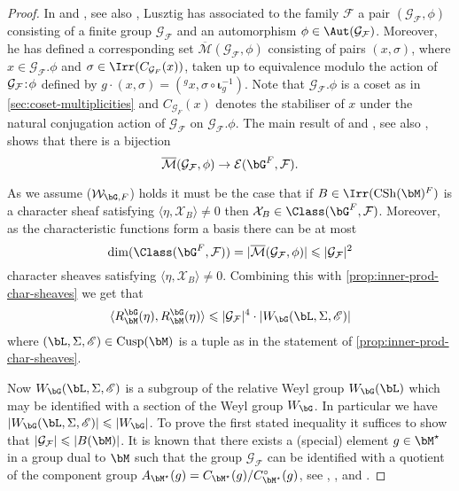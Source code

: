 \documentclass[eqthmnum,nocolour,skinny]{jt-calcs}
\DeclareMathOperator{\CS}{CSh}
\DeclareMathOperator{\Cusp}{Cusp}
\newcommand\sd{
	\mathchoice{\mkern1.5mu}{\mkern1.5mu}{}{}%
	{:}%
	\mathchoice{\mkern1.5mu}{\mkern1.5mu}{}{}
}
\begin{document}
\begin{proof}
In \cite[Chapter 4]{lusztig:1984:characters-of-reductive-groups} and \cite{lusztig:1984:characters-of-reductive-groups-over-finite-fields}, see also \cite{lusztig:2018:on-the-definitions-of-almost-characters}, Lusztig has associated to the family $\mathcal{F}$ a pair $(\mathcal{G_F},\phi)$ consisting of a finite group $\mathcal{G_F}$ and an automorphism $\phi \in \Aut(\mathcal{G_F})$. Moreover, he has defined a corresponding set $\overline{\mathcal{M}}(\mathcal{G_F},\phi)$ consisting of pairs $(x,\sigma)$, where $x \in \mathcal{G_F}.\phi$ and $\sigma \in \Irr(C_{\mathcal{G}_F}(x))$, taken up to equivalence modulo the action of $\mathcal{G_F}\sd\phi$ defined by $g\cdot(x,\sigma) = ({}^gx,\sigma\circ\boldsymbol{\iota}_g^{-1})$. Note that $\mathcal{G_F}.\phi$ is a coset as in \cref{sec:coset-multiplicities} and $C_{\mathcal{G}_F}(x)$ denotes the stabiliser of $x$ under the natural conjugation action of $\mathcal{G_F}$ on $\mathcal{G_F}.\phi$. The main result of \cite{lusztig:1984:characters-of-reductive-groups} and \cite{lusztig:1988:reductive-groups-with-a-disconnected-centre}, see also \cite{lusztig:1984:characters-of-reductive-groups-over-finite-fields}, shows that there is a bijection
\begin{equation*}
\overline{\mathcal{M}}(\mathcal{G_F},\phi) \to \mathcal{E}(\bG^F,\mathcal{F}).
\end{equation*}

As we assume ($\mathcal{W}_{\bG,F}$) holds it must be the case that if $B \in \Irr(\CS(\bM)^F)$ is a character sheaf satisfying $\langle \eta,\mathcal{X}_B\rangle \neq 0$ then $\mathcal{X}_B \in \Class(\bG^F,\mathcal{F})$. Moreover, as the characteristic functions form a basis there can be at most
\begin{equation*}
\dim (\Class(\bG^F,\mathcal{F})) = |\overline{\mathcal{M}}(\mathcal{G_F},\phi)| \leqslant |\mathcal{G_F}|^2
\end{equation*}
character sheaves satisfying $\langle \eta,\mathcal{X}_B\rangle \neq 0$. Combining this with \cref{prop:inner-prod-char-sheaves} we get that
\begin{equation*}
\langle R_{\bM}^{\bG}(\eta), R_{\bM}^{\bG}(\eta)\rangle \leqslant |\mathcal{G_F}|^4\cdot |W_{\bG}(\bL,\Sigma,\mathscr{E})|
\end{equation*}
where $(\bL,\Sigma,\mathscr{E}) \in \Cusp(\bM)$ is a tuple as in the statement of \cref{prop:inner-prod-char-sheaves}.

Now $W_{\bG}(\bL,\Sigma,\mathscr{E})$ is a subgroup of the relative Weyl group $W_{\bG}(\bL)$ which may be identified with a section of the Weyl group $W_{\bG}$. In particular we have $|W_{\bG}(\bL,\Sigma,\mathscr{E})| \leqslant |W_{\bG}|$. To prove the first stated inequality it suffices to show that $|\mathcal{G_F}| \leqslant |B(\bM)|$. It is known that there exists a (special) element $g \in \bM^{\star}$ in a group dual to $\bM$ such that the group $\mathcal{G_F}$ can be identified with a quotient of the component group $A_{\bM^{\star}}(g) = C_{\bM^{\star}}(g)/C_{\bM^{\star}}^{\circ}(g)$, see \cite[Chapter 13]{lusztig:1984:characters-of-reductive-groups}, \cite{lusztig:1984:characters-of-reductive-groups-over-finite-fields}, and \cite{lusztig:2014:families-and-springers-correspondence}.


\end{proof}
\end{document}
